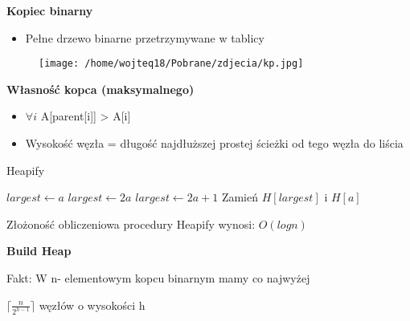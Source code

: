 \documentclass{article}
\begin{document}
    \newpage
    \textbf{Kopiec binarny} \par
    \begin{itemize}
        \item Pełne drzewo binarne przetrzymywane w tablicy
    \end{itemize}
    \vspace{2\baselineskip}
    \begin{figure}[H]
        \centering
        \texttt{[image: /home/wojteq18/Pobrane/zdjecia/kp.jpg]}
        \label{fig:example_image}
    \end{figure}
    \textbf{Własność kopca (maksymalnego)} \par
    \begin{itemize}
        \item $\forall i$ A[parent[i]] > A[i]
        \item Wysokość węzła = długość najdłuższej prostej ścieżki od tego węzła do liścia 
    \end{itemize}
    \vspace{1\baselineskip}
    \begin{algorithm}[H]
    \caption{Heapify}\label{alg:heapify}
    \begin{algorithmic}[1]
        \State $largest \gets a$
            \State $largest \gets 2a$
        \EndIf
            \State $largest \gets 2a + 1$
        \EndIf
            \State Zamień $H[largest]$ i $H[a]$
            \State {}
        \EndIf
    \EndProcedure
    \end{algorithmic}
    \end{algorithm}
    \begin{center}
            Złożoność obliczeniowa procedury Heapify wynosi: $O(log n)$ \par
    \end{center}
    \newpage
    \textbf{Build Heap} \par

    \begin{algorithm} [H]
    \begin{algorithmic}[1] 
        \State {} 
      \EndFor
    \EndProcedure
  \end{algorithmic}
\end{algorithm}
\vspace{1\baselineskip}
Fakt: W n- elementowym kopcu binarnym mamy co najwyżej \par
$\lceil \frac{n}{2^{h-1}} \rceil$ węzłów o wysokości h \par
\vspace{2\baselineskip}
\end{document}
